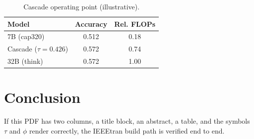 \documentclass[conference]{IEEEtran}
\begin{document}
\begin{table}[t]
\centering
\caption{Cascade operating point (illustrative).}
\label{tab:demo}
\begin{tabular}{@{}lcc@{}}
\toprule
Model & Accuracy & Rel. FLOPs \\
\midrule
7B (cap320)      & 0.512 & 0.18 \\
Cascade ($\tau{=}0.426$) & 0.572 & 0.74 \\
32B (think)      & 0.572 & 1.00 \\
\bottomrule
\end{tabular}
\end{table}

\section{Conclusion}
If this PDF has two columns, a title block, an abstract, a table, and the symbols
$\tau$ and $\phi$ render correctly, the IEEEtran build path is verified end to end.
\end{document}
